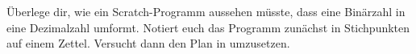 \documentclass[10pt, a4paper]{scrartcl}
\begin{document}
\begin{aufgabe}[symbol=\Large\symStern\yspace\symLaptop\yspace\symPartner]
	Überlege dir, wie ein Scratch-Programm aussehen müsste, dass eine Binärzahl in eine Dezimalzahl umformt. Notiert euch das Programm zunächst in Stichpunkten auf einem Zettel. Versucht dann den Plan in  umzusetzen.
\end{aufgabe}
\end{document}
